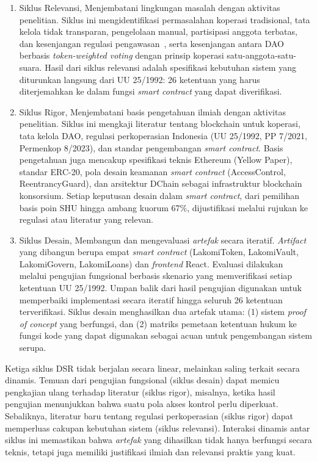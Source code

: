 \begin{enumerate}
	\item Siklus Relevansi, Menjembatani lingkungan masalah dengan aktivitas penelitian. Siklus ini mengidentifikasi permasalahan koperasi tradisional, tata kelola tidak transparan, pengelolaan manual, partisipasi anggota terbatas, dan kesenjangan regulasi pengawasan~\cite{antoni2024permasalahan,putra2025dualisme}, serta kesenjangan antara DAO berbasis \textit{token-weighted voting} dengan prinsip koperasi satu-anggota-satu-suara. Hasil dari siklus relevansi adalah spesifikasi kebutuhan sistem yang diturunkan langsung dari UU 25/1992: 26 ketentuan yang harus diterjemahkan ke dalam fungsi \textit{smart contract} yang dapat diverifikasi.

	\item Siklus Rigor, Menjembatani basis pengetahuan ilmiah dengan aktivitas penelitian. Siklus ini mengkaji literatur tentang blockchain untuk koperasi, tata kelola DAO, regulasi perkoperasian Indonesia (UU 25/1992, PP 7/2021, Permenkop 8/2023), dan standar pengembangan \textit{smart contract}. Basis pengetahuan juga mencakup spesifikasi teknis Ethereum (Yellow Paper), standar ERC-20, pola desain keamanan \textit{smart contract} (AccessControl, ReentrancyGuard), dan arsitektur DChain sebagai infrastruktur blockchain konsorsium. Setiap keputusan desain dalam \textit{smart contract}, dari pemilihan basis poin SHU hingga ambang kuorum 67\%, dijustifikasi melalui rujukan ke regulasi atau literatur yang relevan.

	\item Siklus Desain, Membangun dan mengevaluasi \textit{artefak} secara iteratif. \textit{Artifact} yang dibangun berupa empat \textit{smart contract} (LakomiToken, LakomiVault, LakomiGovern, LakomiLoans) dan \textit{frontend} React. Evaluasi dilakukan melalui pengujian fungsional berbasis skenario yang memverifikasi setiap ketentuan UU 25/1992. Umpan balik dari hasil pengujian digunakan untuk memperbaiki implementasi secara iteratif hingga seluruh 26 ketentuan terverifikasi. Siklus desain menghasilkan dua artefak utama: (1) sistem \textit{proof of concept} yang berfungsi, dan (2) matriks pemetaan ketentuan hukum ke fungsi kode yang dapat digunakan sebagai acuan untuk pengembangan sistem serupa.
\end{enumerate}

Ketiga siklus DSR tidak berjalan secara linear, melainkan saling terkait secara dinamis. Temuan dari pengujian fungsional (siklus desain) dapat memicu pengkajian ulang terhadap literatur (siklus rigor), misalnya, ketika hasil pengujian menunjukkan bahwa suatu pola akses kontrol perlu diperkuat. Sebaliknya, literatur baru tentang regulasi perkoperasian (siklus rigor) dapat memperluas cakupan kebutuhan sistem (siklus relevansi). Interaksi dinamis antar siklus ini memastikan bahwa \textit{artefak} yang dihasilkan tidak hanya berfungsi secara teknis, tetapi juga memiliki justifikasi ilmiah dan relevansi praktis yang kuat.

